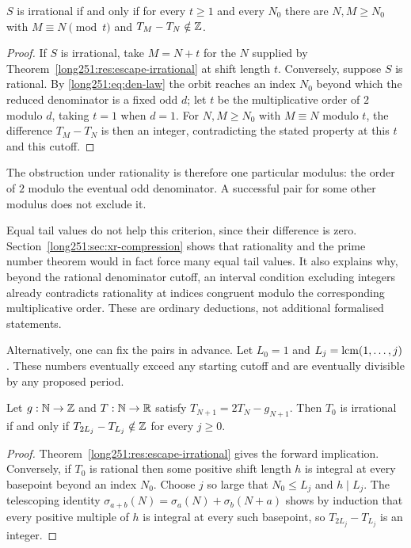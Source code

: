 \documentclass[11pt]{article}
\makeatletter
\newcommand{\compatlabel}[1]{\ltx@label{#1}}
\makeatother
\begin{document}
\begin{theorem}\label{long251:res:freepair}
$S$ is irrational if and only if for every $t\ge1$ and every $N_0$ there are
$N,M\ge N_0$ with $M\equiv N\pmod t$ and $T_M-T_N\notin\mathbb{Z}$.
\end{theorem}

\begin{proof}
If $S$ is irrational, take $M=N+t$ for the $N$ supplied by
Theorem~\ref{long251:res:escape-irrational} at shift length $t$.  Conversely, suppose
$S$ is rational.  By \eqref{long251:eq:den-law} the orbit reaches an index $N_0$ beyond
which the reduced denominator is a fixed odd $d$; let $t$ be the
multiplicative order of $2$ modulo $d$, taking $t=1$ when $d=1$.  For $N,M\ge N_0$ with $M\equiv N$
modulo $t$, the difference $T_M-T_N$ is then an integer, contradicting the
stated property at this $t$ and this cutoff.
\end{proof}

The obstruction under rationality is therefore one particular modulus:
the order of $2$ modulo the eventual odd denominator.  A successful
pair for some other modulus does not exclude it.

Equal tail values do not help this criterion, since their difference is
zero.  Section~\ref{long251:sec:xr-compression} shows that rationality and
the prime number theorem would in fact force many equal tail values.
It also explains why, beyond the rational denominator cutoff, an interval
condition excluding integers already contradicts rationality at indices
congruent modulo the corresponding multiplicative order.  These are
ordinary deductions, not additional formalised statements.

Alternatively, one can fix the pairs in advance.  Let $L_0=1$ and
$L_j=\operatorname{lcm}(1,\ldots,j)$.  These numbers eventually exceed any starting
cutoff and are eventually divisible by any proposed period.

\begin{theorem}\label{long251:res:lcmdiagonal}\compatlabel{res:lcmdiagonal}
Let $g:\mathbb{N}\to\mathbb{Z}$ and $T:\mathbb{N}\to\mathbb{R}$ satisfy $T_{N+1}=2T_N-g_{N+1}$.  Then
$T_0$ is irrational if and only if
$T_{2L_j}-T_{L_j}\notin\mathbb{Z}$ for every $j\ge0$.
\end{theorem}

\begin{proof}
Theorem~\ref{long251:res:escape-irrational} gives the forward implication.  Conversely,
if $T_0$ is rational then some positive shift length $h$ is integral at every
basepoint beyond an index $N_0$.  Choose $j$ so large that $N_0\le L_j$ and
$h\mid L_j$.  The telescoping identity
$\sigma_{a+b}(N)=\sigma_a(N)+\sigma_b(N+a)$ shows by induction that every
positive multiple of $h$ is integral at every such basepoint, so
$T_{2L_j}-T_{L_j}$ is an integer.
\end{proof}
\end{document}
